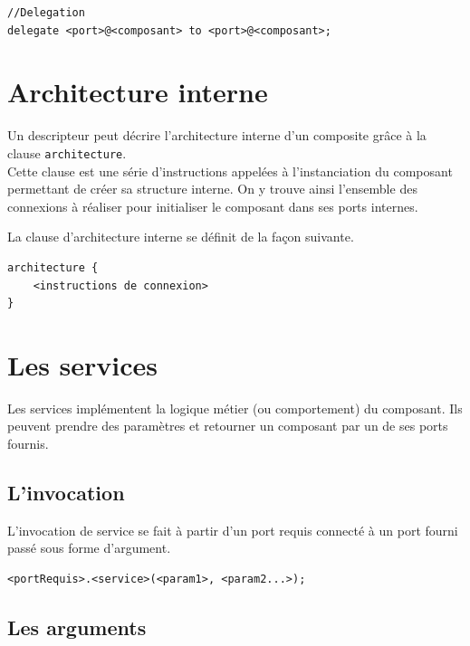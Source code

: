 \documentclass[11pt,a4paper,openany,oneside]{book}
\begin{document}
\begin{lstlisting}[language=Compo, frame=single, caption=Syntaxe de la délégation]
//Delegation
delegate <port>@<composant> to <port>@<composant>;
\end{lstlisting}

\section{Architecture interne}

Un descripteur peut décrire l'architecture interne d'un composite grâce à la clause \texttt{architecture}.\\
Cette clause est une série d'instructions appelées à l'instanciation du composant permettant de créer sa structure interne. On y trouve ainsi l'ensemble des connexions à réaliser pour initialiser le composant dans ses ports internes.

La clause d'architecture interne se définit de la façon suivante. 

\begin{lstlisting}[language=Compo, caption=Syntaxe de la définition d'une clause architecture, frame=single]
architecture {
    <instructions de connexion>
}
\end{lstlisting}

\section{Les services}

Les services implémentent la logique métier (ou comportement) du composant. Ils peuvent prendre des paramètres et retourner un composant par un de ses ports fournis.

\subsection{L'invocation}

L'invocation de service se fait à partir d'un port requis connecté à un port fourni passé sous forme d'argument.
\begin{lstlisting}[frame=single, caption=Syntaxe de l'invocation de service]
<portRequis>.<service>(<param1>, <param2...>);
\end{lstlisting}

\subsection{Les arguments}
\end{document}
